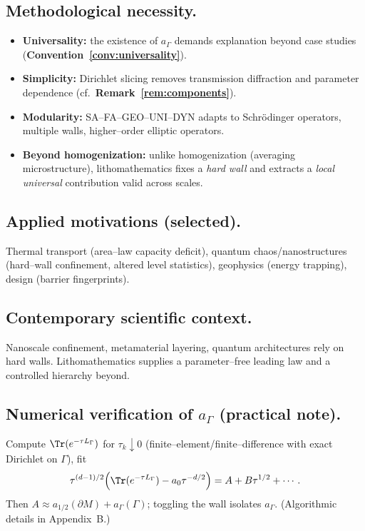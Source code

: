 \subsection{Methodological necessity.}\label{subsec:method-necessity}
\begin{itemize}
  \item \textbf{Universality:} the existence of $a_\Gamma$ demands explanation beyond case studies (\textbf{Convention~\ref{conv:universality}}).
  \item \textbf{Simplicity:} Dirichlet slicing removes transmission diffraction and parameter dependence (cf.\ \textbf{Remark~\ref{rem:components}}).
  \item \textbf{Modularity:} SA–FA–GEO–UNI–DYN adapts to Schr\"odinger operators, multiple walls, higher–order elliptic operators.
  \item \textbf{Beyond homogenization:} unlike homogenization (averaging microstructure), lithomathematics fixes a \emph{hard wall} and extracts a \emph{local universal} contribution valid across scales.
\end{itemize}

\subsection{Applied motivations (selected).}\label{subsec:applied}
Thermal transport (area–law capacity deficit), quantum chaos/nanostructures (hard–wall confinement, altered level statistics), geophysics (energy trapping), design (barrier fingerprints).

\subsection{Contemporary scientific context.}\label{subsec:context}
Nanoscale confinement, metamaterial layering, quantum architectures rely on hard walls.
Lithomathematics supplies a parameter–free leading law and a controlled hierarchy beyond.

\subsection{Numerical verification of $a_\Gamma$ (practical note).}\label{subsec:numerics}
Compute $\Tr(e^{-\tau L_\Gamma})$ for $\tau_k\downarrow 0$ (finite–element/finite–difference with exact Dirichlet on $\Gamma$), fit
\[
\tau^{(d-1)/2}\!\left(\Tr(e^{-\tau L_\Gamma})-a_0\tau^{-d/2}\right)=A+B\tau^{1/2}+\cdots.
\]
Then $A \approx a_{1/2}(\partial M)+a_\Gamma(\Gamma)$; toggling the wall isolates $a_\Gamma$.
(Algorithmic details in Appendix~B.)


